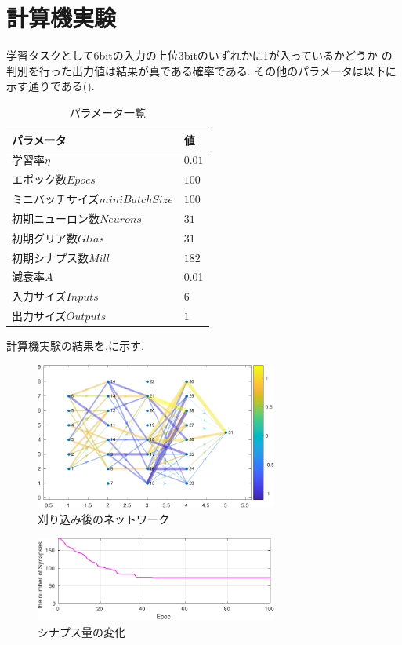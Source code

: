 \documentclass[a4paper,10.5pt,twocolumn]{jsarticle}
\begin{document}
\section{計算機実験}
学習タスクとして6bitの入力の上位3bitのいずれかに1が入っているかどうか
の判別を行った出力値は結果が真である確率である. 
その他のパラメータは以下に示す通りである().
\begin{table}[H]
  \caption{パラメータ一覧}
  \label{tab:param}
  \centering
   \begin{tabular}{ll}
    \toprule
      パラメータ&値\\\midrule\midrule
      学習率$\eta$&$0.01$\\
      エポック数$Epocs$&$100$\\
      ミニバッチサイズ$miniBatchSize$&$100$\\
      初期ニューロン数$Neurons$&$31$\\
      初期グリア数$Glias$&$31$\\
      初期シナプス数$Mill$&$182$\\
      減衰率$A$&0.01\\
      入力サイズ$Inputs$&$6$\\
      出力サイズ$Outputs$&$1$\\
    \bottomrule
   \end{tabular}
 \end{table}
計算機実験の結果を,に示す.
\begin{figure}[H]
  \centering
  \includegraphics[width=8cm]{Graph-crop.pdf} 
  \caption{刈り込み後のネットワーク}
  \label{fig:Graph}
\end{figure}
\vspace{-2zh}
\begin{figure}[H]
  \centering
  \includegraphics[width=8cm]{SynapseNum-crop.pdf} 
  \caption{シナプス量の変化}
  \label{fig:SynapseNum}
\end{figure}
\end{document}
